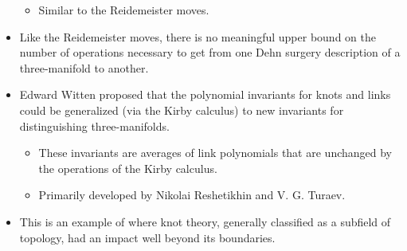 \documentclass[titlepage]{article}
\numberwithin{figure}{section}
\numberwithin{table}{section}
\numberwithin{equation}{section}
\begin{document}
\begin{itemize}
    \begin{itemize}
        \item Similar to the Reidemeister moves.
    \end{itemize}
    \item Like the Reidemeister moves, there is no meaningful upper bound on the number of operations necessary to get from one Dehn surgery description of a three-manifold to another.
    \item Edward Witten proposed that the polynomial invariants for knots and links could be generalized (via the Kirby calculus) to new invariants for distinguishing three-manifolds.
    \begin{itemize}
        \item These invariants are averages of link polynomials that are unchanged by the operations of the Kirby calculus.
        \item Primarily developed by Nikolai Reshetikhin and V. G. Turaev.
    \end{itemize}
    \item This is an example of where knot theory, generally classified as a subfield of topology, had an impact well beyond its boundaries.
\end{itemize}
\end{document}
